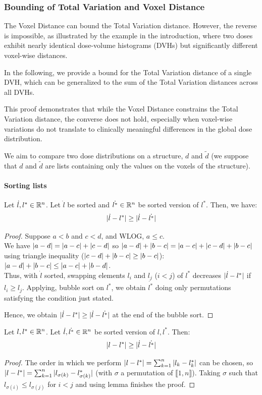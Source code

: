 \subsubsection{Bounding of Total Variation and Voxel Distance}
The Voxel Distance can bound the Total Variation distance.
However, the reverse is impossible, as illustrated by the example in the introduction, where two doses exhibit nearly identical dose-volume histograms (DVHs) but significantly different voxel-wise distances.

In the following, we provide a bound for the Total Variation distance of a single DVH, which can be generalized to the sum of the Total Variation distances across all DVHs.

This proof demonstrates that while the Voxel Distance constrains the Total Variation distance, the converse does not hold, especially when voxel-wise variations do not translate to clinically meaningful differences in the global dose distribution.

We aim to compare two dose distributions on a structure, $d$ and $\tilde{d}$ (we suppose that $d$ and $\tilde{d}$ are lists containing only the values on the voxels of the structure).

\paragraph{Sorting lists}
\begin{lemma}
	\label{lemma:sorting_lists}
	Let $\dot{l}, l^* \in \mathbb{R}^n$. Let $\dot{l}$ be sorted and $\dot{l^*} \in \mathbb{R}^n$ be sorted version of $l^*$.
	Then, we have:
	$$|{\dot{l} - l^*}| \geq |{\dot{l} - \dot{l^*}}|$$
\end{lemma}
\begin{proof}
	Suppose $a<b$ and $c<d$, and WLOG, $a\leq c$.\\
	We have $|{a-d}| = |{a-c}|+|{c-d}|$
	so $|{a-d}|+|{b-c}| = |{a-c}|+|{c-d}|+|{b-c}|$
	using triangle inequality ($|{c-d}|+|{b-c}| \geq |{b-c}|$):
	$|{a-d}|+|{b-c}| \leq |{a-c}|+|{b-d}|$.\\
	Thus, with $\dot{l}$ sorted, swapping elements $l_i$ and $l_j$ ($i<j$) of $l^*$ decreases $|{\dot{l} - l^*}|$ if $l_i \geq l_j$.
	Applying, bubble sort on $l^*$, we obtain $\dot{l^*}$ doing only permutations satisfying the condition just stated.
	
	Hence, we obtain $|{\dot{l} - l^*}| \geq |{\dot{l} - \dot{l^*}}|$ at the end of the bubble sort.
\end{proof}
\begin{corollary}
	\label{corollary:sorting_lists}
	Let $l, l^* \in \mathbb{R}^n$. Let $\dot{l},\dot{l^*} \in \mathbb{R}^n$ be sorted version of $l, l^*$.
	Then: $$|{l - l^*}| \geq |{\dot{l} - \dot{l^*}}|$$
\end{corollary}
\begin{proof}
	The order in which we perform $|{l - l^*}| = \sum_{k=1}^{n} |{l_k-l^*_k}|$ can be chosen, so $|{l - l^*}| = \sum_{k=1}^{n} |{l_{\sigma(k)}-l^*_{\sigma(k)}}|$ (with $\sigma$ a permutation of $\llbracket 1,n \rrbracket$).
	Taking $\sigma$ such that $l_{\sigma(i)} \leq l_{\sigma(j)}$ for $i<j$ and using lemma finishes the proof.
\end{proof}

